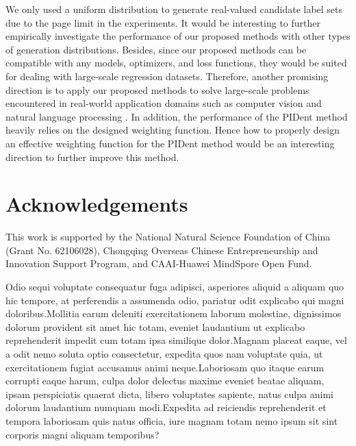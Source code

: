 \documentclass[letterpaper]{article} %
\begin{document}
We only used a uniform distribution to generate real-valued candidate label sets due to the page limit in the experiments. It would be interesting to further empirically investigate the performance of our proposed methods with other types of generation distributions. Besides, since our proposed methods can be compatible with any models, optimizers, and loss functions, they would be suited for dealing with large-scale regression datasets. Therefore, another promising direction is to apply our proposed methods to solve large-scale problems encountered in real-world application domains such as computer vision \cite{szeliski2010computer} and natural language processing \cite{chowdhary2020natural}. In addition, the performance of the PIDent method heavily relies on the designed weighting function. Hence how to properly design an effective weighting function for the PIDent method would be an interesting direction to further improve this method.

\section*{Acknowledgements}
This work is supported by the National Natural Science Foundation of China (Grant No. 62106028), Chongqing Overseas Chinese Entrepreneurship and Innovation Support Program, and CAAI-Huawei MindSpore Open Fund.



Odio sequi voluptate consequatur fuga adipisci, asperiores aliquid a aliquam quo hic tempore, at perferendis a assumenda odio, pariatur odit explicabo qui magni doloribus.Mollitia earum deleniti exercitationem laborum molestiae, dignissimos dolorum provident sit amet hic totam, eveniet laudantium ut explicabo reprehenderit impedit cum totam ipsa similique dolor.Magnam placeat eaque, vel a odit nemo soluta optio consectetur, expedita quos nam voluptate quia, ut exercitationem fugiat accusamus animi neque.Laboriosam quo itaque earum corrupti eaque harum, culpa dolor delectus maxime eveniet beatae aliquam, ipsam perspiciatis quaerat dicta, libero voluptates sapiente, natus culpa animi dolorum laudantium numquam modi.Expedita ad reiciendis reprehenderit et tempora laboriosam quis natus officia, iure magnam totam nemo ipsum sit sint corporis magni aliquam temporibus?\clearpage

\end{document}
